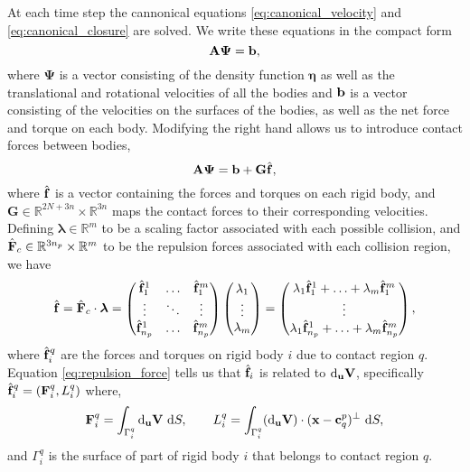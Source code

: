 At each time step the cannonical equations \eqref{eq:canonical_velocity} and \eqref{eq:canonical_closure} are solved. We write these equations in the compact form
\[ \mathbf{A}\bm{\Psi} = {\mathbf{b}},\]
where $\bm{\Psi}$ is a vector consisting of the density function $\bm{\eta}$ as well as the translational and rotational velocities of all the bodies and ${\mathbf{b}}$ is a vector consisting of the velocities on the surfaces of the bodies, as well as the net force and torque on each body. Modifying the right hand allows us to introduce contact forces between bodies,
 \begin{equation}\label{eq:compact} \mathbf{A}\bm{\Psi} = {\mathbf{b}} + \mathbf{G}\hat{{\mathbf{f}}},\end{equation}
where $\hat{{\mathbf{f}}}$ is a vector containing the forces and torques on each rigid body, and $\mathbf{G}\in \mathbb{R}^{2N+3n}\times\mathbb{R}^{3n}$ maps the contact forces to their corresponding velocities. Defining $\bm{\lambda}\in \mathbb{R}^m$ to be a scaling factor associated with each possible collision, and $\hat{{\mathbf{F}}}_c \in \mathbb{R}^{3n_p}\times \mathbb{R}^m$ to be the repulsion forces associated with each collision region, we have
\[
	\hat{{\mathbf{f}}} = \hat{{\mathbf{F}}}_c\cdot\bm{\lambda} =  \begin{pmatrix} \hat{{\mathbf{f}}}_1^1 & \hdots & \hat{{\mathbf{f}}}^{m}_1\\  \vdots & \ddots & \vdots \\ \hat{{\mathbf{f}}}_{n_p}^1 & \hdots & \hat{{\mathbf{f}}}_{n_p}^m\end{pmatrix} \begin{pmatrix} \lambda_1 \\ \vdots \\ \lambda_m\end{pmatrix} = \begin{pmatrix} \lambda_1 \hat{{\mathbf{f}}}_1^1 + \hdots + \lambda_m\hat{{\mathbf{f}}}_1^m\\ \vdots \\\lambda_1 \hat{{\mathbf{f}}}_{n_p}^1 + \hdots + \lambda_m\hat{{\mathbf{f}}}_{n_p}^m\end{pmatrix},
\]
where $\hat{{\mathbf{f}}}_i^q$ are the forces and torques on rigid body $i$ due to contact region $q$. Equation \eqref{eq:repulsion_force} tells us that $\hat{{\mathbf{f}}}_i$ is related to $\text{d}_{\mathbf{u}} {\mathbf{V}}$, specifically $\hat{{\mathbf{f}}}^q_i = ({\mathbf{F}}^q_i, L^q_i)$ where,
\begin{equation}\label{eq:stiv_force} {\mathbf{F}}^q_i = \int_{\Gamma^q_i} \text{d}_{\mathbf{u}} {\mathbf{V}}~\text{d}S, \qquad L^q_i =\int_{\Gamma^q_i} (\text{d}_{\mathbf{u}} {\mathbf{V}})\cdot({\mathbf{x}} -{\mathbf{c}}^p_q)^\perp~\text{d}S,\end{equation}
and $\Gamma_i^q$ is the surface of part of rigid body $i$ that belongs to contact region $q$.

